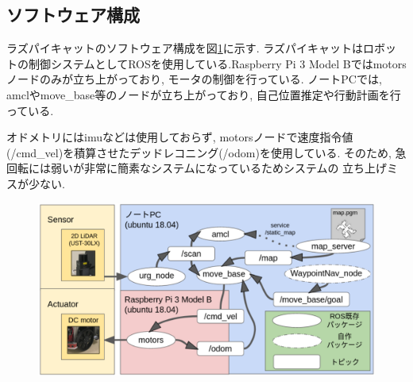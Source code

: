 \subsection{ソフトウェア構成}
ラズパイキャットのソフトウェア構成を図\ref{fig:raspicat-software-config}に示す.
ラズパイキャットはロボットの制御システムとしてROSを使用している.Raspberry Pi 3 Model Bではmotorsノードのみが立ち上がっており, 
モータの制御を行っている. 
ノートPCでは, amclやmove\_base等のノードが立ち上がっており, 
自己位置推定や行動計画を行っている.

オドメトリにはimuなどは使用しておらず, 
motorsノードで速度指令値(/cmd\_vel)を積算させたデッドレコニング(/odom)を使用している. 
そのため, 急回転には弱いが非常に簡素なシステムになっているためシステムの
立ち上げミスが少ない.



\begin{figure}[H]
	\begin{center}
		\includegraphics[width=0.9\linewidth]{figs/raspicat-software-config.pdf}
		\caption{}
		\label{fig:raspicat-software-config}
	\end{center}
\end{figure}